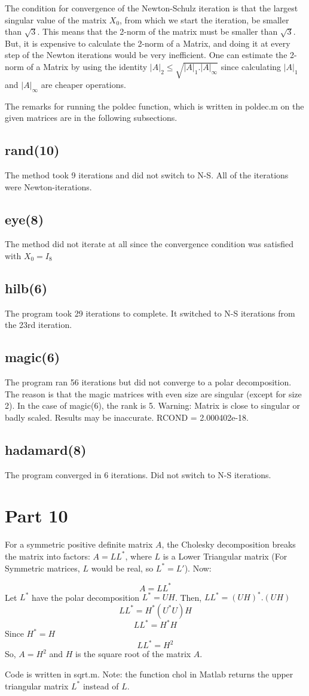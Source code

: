 \documentclass{article}
\begin{document}
The condition for convergence of the Newton-Schulz iteration is that the largest singular value of the matrix $X_0$, from which we start the iteration, be smaller than $\sqrt{3}$. This means that the 2-norm of the matrix must be smaller than $\sqrt{3}$. But, it is expensive to calculate the 2-norm of a Matrix, and doing it at every step of the Newton iterations would be very inefficient. One can estimate the 2-norm of a Matrix by using the identity $|A|_2 \leq \sqrt{|A|_1 . |A|_\infty}$ since calculating $|A|_1$ and $|A|_\infty$ are cheaper operations.

The remarks for running the poldec function, which is written in poldec.m on the given matrices are in the following subsections.

\subsection{rand(10)}
The method took 9 iterations and did not switch to N-S. All of the iterations were Newton-iterations.
\subsection{eye(8)}
The method did not iterate at all since the convergence condition was satisfied with $X_0 = I_8$
\subsection{hilb(6)}
The program took 29 iterations to complete. It switched to N-S iterations from the 23rd iteration.
\subsection{magic(6)}
The program ran 56 iterations but did not converge to a polar decomposition. The reason is that the magic matrices with even size are singular (except for size 2). In the case of magic(6), the rank is 5.
Warning: Matrix is close to singular or badly scaled. Results may be inaccurate. RCOND =  2.000402e-18.
\subsection{hadamard(8)}
The program converged in 6 iterations. Did not switch to N-S iterations.

\newpage
\section{Part 10}
For a symmetric positive definite matrix $A$, the Cholesky decomposition breaks the matrix into factors: $A = L L^*$, where $L$ is a Lower Triangular matrix (For Symmetric matrices, $L$ would be real, so $L^* = L'$). Now:

\[A = L L^*\]
Let $L^*$ have the polar decomposition $L^* = UH$. Then, $L L^* = (UH)^*.(UH)$
\[LL^* = H^*(U^*U)H\]
\[LL^* = H^*H\]
Since $H^*=H$
\[LL^* = H^2\]
So, $A = H^2$
and $H$ is the square root of the matrix $A$.

Code is written in sqrt.m. Note: the function chol in Matlab returns the upper triangular matrix $L^*$ instead of $L$.
\end{document}
